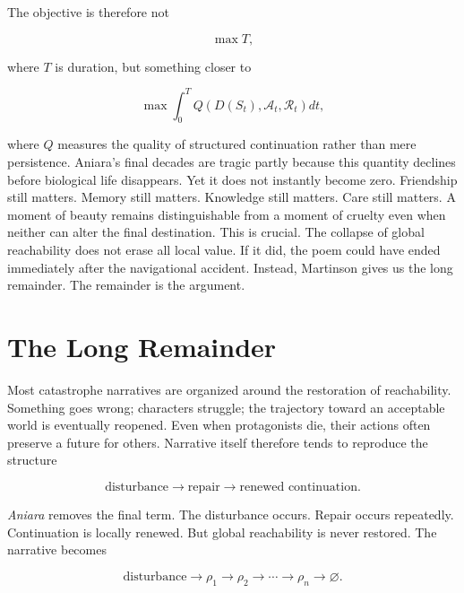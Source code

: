\documentclass[11pt,oneside]{book}
\theoremstyle{definition}
\theoremstyle{remark}
\begin{document}
The objective is therefore not

\[
\max T,
\]

where \(T\) is duration, but something closer to

\[
\max \int_0^T Q\!\left( D(S_t), \mathcal{A}_t, \mathcal{R}_t \right)dt,
\]

where \(Q\) measures the quality of structured continuation rather than mere persistence. Aniara's
final decades are tragic partly because this quantity declines before biological life disappears.
Yet it does not instantly become zero. Friendship still matters. Memory still matters. Knowledge
still matters. Care still matters. A moment of beauty remains distinguishable from a moment of
cruelty even when neither can alter the final destination. This is crucial. The collapse of global
reachability does not erase all local value. If it did, the poem could have ended immediately after
the navigational accident. Instead, Martinson gives us the long remainder. The remainder is the
argument.

\section{The Long Remainder}

Most catastrophe narratives are organized around the restoration of reachability. Something goes
wrong; characters struggle; the trajectory toward an acceptable world is eventually reopened. Even
when protagonists die, their actions often preserve a future for others. Narrative itself therefore
tends to reproduce the structure

\[
\text{disturbance} \rightarrow \text{repair} \rightarrow \text{renewed continuation}.
\]

\emph{Aniara} removes the final term. The disturbance occurs. Repair occurs repeatedly. Continuation
is locally renewed. But global reachability is never restored. The narrative becomes

\[
\text{disturbance} \rightarrow \rho_1 \rightarrow \rho_2 \rightarrow \cdots \rightarrow \rho_n \rightarrow \varnothing.
\]
\end{document}
